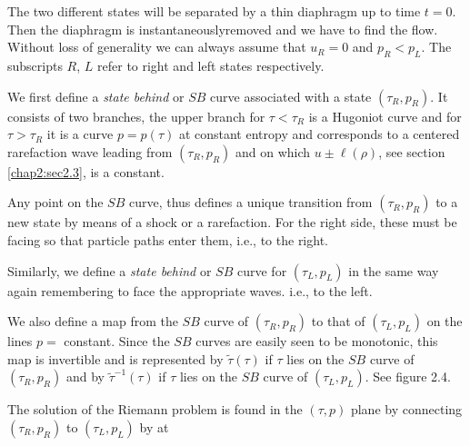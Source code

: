 The two different states will be separated by a thin diaphragm up to time $t=0$. Then the diaphragm is instantaneously\pageoriginale removed  and we have to find the flow. Without loss of generality we can always assume that $u_R=0$ and $p_R < p_L$. The subscripts $R$, $L$ refer to right and left states respectively.

We first define a {\em state behind} or $SB$ curve associated with a state $(\tau_R, p_R)$. It consists of two branches, the upper branch for $\tau < \tau_R$ is a Hugoniot curve  and for $\tau > \tau_R$ it is a curve $p=p(\tau)$ at constant entropy and corresponds to a centered rarefaction wave leading from $(\tau_R, p_R)$ and on which $u\pm \ell (\rho)$, see section \ref{chap2:sec2.3}, is a constant.

Any point on the $SB$ curve, thus defines a unique transition from $(\tau_R, p_R)$ to a new state by means of a shock or a rarefaction. For the right side, these must be facing so that particle paths enter them, i.e., to the right.

Similarly, we define a {\em state behind} or $SB$ curve for $(\tau_L, p_L)$ in the same way again remembering to face the appropriate waves. i.e.,  to the left.

We also define a map from the $SB$ curve of $(\tau_R, p_R)$ to that of $(\tau_L, p_L)$ on the lines $p = $ constant. Since the $SB$ curves are easily seen to be monotonic, this map is invertible and is represented by $\tilde{\tau}(\tau)$ if $\tau$ lies  on the $SB$ curve of $(\tau_R, p_R)$ and by ${\tilde{\tau}}^{-1} (\tau)$ if $\tau$ lies on the $SB$ curve of $(\tau_L, p_L)$. See figure 2.4.

The solution of the Riemann problem is found in the $(\tau, p)$ plane by connecting $(\tau_R, p_R)$ to $(\tau_L, p_L)$ by at 

